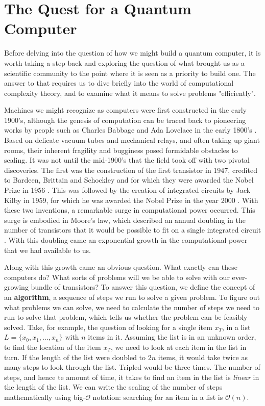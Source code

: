 \chapter{The Quest for a Quantum Computer}
\label{sec:quest}
Before delving into the question of how we might build a quantum computer, it is worth taking a step
back and exploring the question of what brought us as a scientific community to the point where
it is seen as a priority to build one. The answer to that requires us to dive briefly into
the world of computational complexity theory, and to examine what it means to solve problems "efficiently".

Machines we might recognize as computers were first constructed  in the early 1900's, although the genesis
of computation can be traced back to pioneering works by people such as Charles Babbage and Ada Lovelace
in the early 1800's \cite{Bowden:1953:FTS:1102044}. Based on delicate vacuum tubes and mechanical relays,
and often taking up giant rooms, their inherent fragility and bugginess posed formidable obstacles to scaling.
It was not until the mid-1900's that the field took off with two pivotal discoveries. The first
was the construction of the first transistor in 1947, credited to Bardeen, Brittain and Schockley and for which
they were awarded the Nobel Prize in 1956 \cite{nobel1956}. This was followed by the creation of integrated circuits by Jack Kilby
in 1959, for which he was awarded the Nobel Prize in the year 2000 \cite{nobel2000}. With these two inventions, a remarkable
surge in computational power occurred. This surge is embodied in Moore's law, which described an annual
doubling in the number of transistors that it would be possible to fit on a single integrated circuit \cite{4785860}.
With this doubling came an exponential growth in the computational power that we had available to us.

Along with this growth came an obvious question. What exactly can these computers do? What sorts of
problems will we be able to solve with our ever-growing bundle of transistors? To answer this question, we define
the concept of an \textbf{algorithm}, a sequence of steps we run to solve a given problem. To figure out
what problems we can solve, we need to calculate the number of steps we need to run to solve that problem,
which tells us whether the problem can be feasibly solved. Take, for example, the question of looking
for a single item $x_T$, in a list $L = \{x_0, x_1, \dots, x_n\}$ with $n$ items in it. Assuming the list
is in an unknown order, to find the location of the item $x_T$, we need to look at each item in the list
in turn. If the length of the list were doubled to $2n$ items, it would take twice as many steps to
look through the list. Tripled would be three times. The number of steps, and hence te amount of time,
it takes to find an item in the list is \emph{linear} in the length of the list. We can write the scaling of
the number of steps mathematically using big-$\mathcal{O}$ notation: searching for an item in a list is $\mathcal{O}(n)$.

